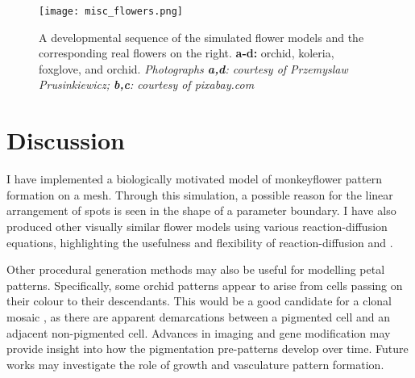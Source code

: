 \begin{table}[ht]
	\centering
	\caption {Parameter values for the California kingsnake model.}
	\label{tab:snakeParameters}
\end{table}

\begin{figure}[p]
	\centering
	\texttt{[image: misc\_flowers.png]}
	\caption{A developmental sequence of the simulated flower models and the corresponding real flowers on the right. \textbf{a-d:} orchid, koleria, foxglove, and orchid. \textit{Photographs \textbf{a,d}: courtesy of Przemyslaw Prusinkiewicz; \textbf{b,c}: courtesy of pixabay.com}}
	\label{fig:miscFlowers}
\end{figure}

\section{Discussion}

I have implemented a biologically motivated model of monkeyflower pattern formation on a mesh. Through this simulation, a possible reason for the linear arrangement of spots is seen in the shape of a parameter boundary. I have also produced other visually similar flower models using various reaction-diffusion equations, highlighting the usefulness and flexibility of reaction-diffusion and \ProgramName{}.

Other procedural generation methods may also be useful for modelling petal patterns. Specifically, some orchid patterns appear to arise from cells passing on their colour to their descendants. This would be a good candidate for a clonal mosaic \citep{korn2007}, as there are apparent demarcations between a pigmented cell and an adjacent non-pigmented cell. Advances in imaging and gene modification may provide insight into how the pigmentation pre-patterns develop over time. Future works may investigate the role of growth and vasculature pattern formation.